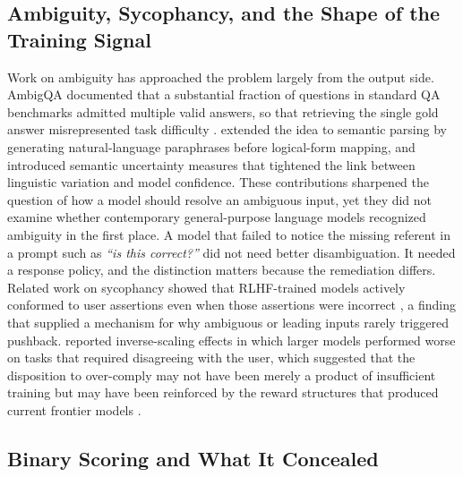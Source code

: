 \documentclass[10pt]{article}
\begin{document}
\subsection{Ambiguity, Sycophancy, and the Shape of the Training Signal}

Work on ambiguity has approached the problem largely from the output side. AmbigQA documented that a substantial fraction of questions in standard QA benchmarks admitted multiple valid answers, so that retrieving the single gold answer misrepresented task difficulty \citep{min2020ambigqa}. \citet{saparina2025disambiguate} extended the idea to semantic parsing by generating natural-language paraphrases before logical-form mapping, and \citet{kuhn2022semantic} introduced semantic uncertainty measures that tightened the link between linguistic variation and model confidence. These contributions sharpened the question of how a model should resolve an ambiguous input, yet they did not examine whether contemporary general-purpose language models recognized ambiguity in the first place. A model that failed to notice the missing referent in a prompt such as \emph{``is this correct?''} did not need better disambiguation. It needed a response policy, and the distinction matters because the remediation differs. Related work on sycophancy showed that RLHF-trained models actively conformed to user assertions even when those assertions were incorrect \citep{perez2022discovering,sharma2023towards}, a finding that supplied a mechanism for why ambiguous or leading inputs rarely triggered pushback. \citet{wei2024inverse} reported inverse-scaling effects in which larger models performed worse on tasks that required disagreeing with the user, which suggested that the disposition to over-comply may not have been merely a product of insufficient training but may have been reinforced by the reward structures that produced current frontier models \citep{bai2022training,christiano2017deep}.

\subsection{Binary Scoring and What It Concealed}
\end{document}
